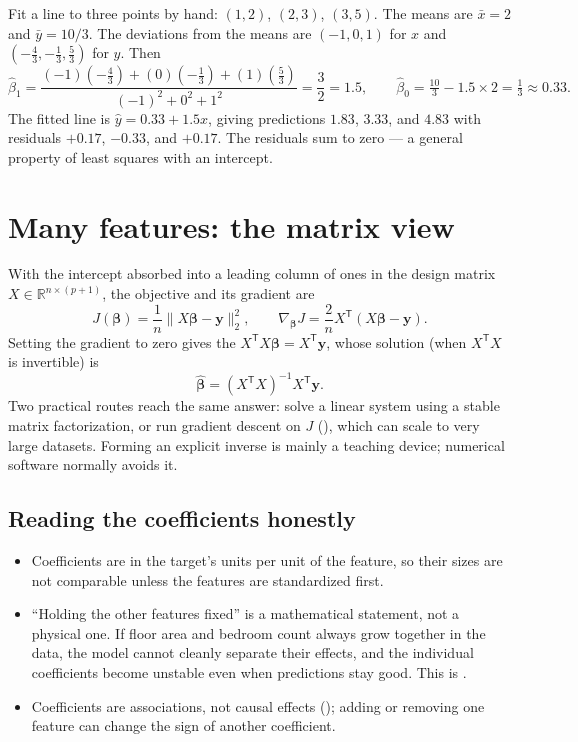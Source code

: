\begin{workedexample}
Fit a line to three points by hand: $(1,2)$, $(2,3)$, $(3,5)$.
The means are $\bar{x}=2$ and $\bar{y}=10/3$. The deviations from the means are $(-1,0,1)$ for $x$ and $(-\tfrac{4}{3},-\tfrac{1}{3},\tfrac{5}{3})$ for $y$. Then
\[
  \hat{\beta}_1
  =\frac{(-1)(-\tfrac{4}{3})+(0)(-\tfrac{1}{3})+(1)(\tfrac{5}{3})}
        {{(-1)}^2+0^2+1^2}
  =\frac{3}{2}=1.5,
  \qquad
  \hat{\beta}_0=\tfrac{10}{3}-1.5\times 2=\tfrac{1}{3}\approx 0.33.
\]
The fitted line is $\hat{y}=0.33+1.5x$, giving predictions $1.83$, $3.33$, and $4.83$ with residuals $+0.17$, $-0.33$, and $+0.17$. The residuals sum to zero --- a general property of least squares with an intercept.
\end{workedexample}

\section{Many features: the matrix view}

With the intercept absorbed into a leading column of ones in the design matrix $X\in\mathbb{R}^{n\times(p+1)}$, the objective and its gradient are
\[
  J(\bm{\beta})=\frac{1}{n}\|X\bm{\beta}-\bm{y}\|_2^2,
  \qquad
  \nabla_{\bm{\beta}}J
  =\frac{2}{n}X^{\mathsf T}(X\bm{\beta}-\bm{y}).
\]
Setting the gradient to zero gives the  $X^{\mathsf T}X\bm{\beta}=X^{\mathsf T}\bm{y}$, whose solution (when $X^{\mathsf T}X$ is invertible) is
\[
  \hat{\bm{\beta}}={(X^{\mathsf T}X)}^{-1}X^{\mathsf T}\bm{y}.
\]
Two practical routes reach the same answer: solve a linear system using a stable matrix factorization, or run gradient descent on $J$ (), which can scale to very large datasets. Forming an explicit inverse is mainly a teaching device; numerical software normally avoids it.

\subsection{Reading the coefficients honestly}

\begin{itemize}
  \item Coefficients are in the target's units per unit of the feature, so their sizes are not comparable unless the features are standardized first.
  \item ``Holding the other features fixed'' is a mathematical statement, not a physical one. If floor area and bedroom count always grow together in the data, the model cannot cleanly separate their effects, and the individual coefficients become unstable even when predictions stay good. This is .
  \item Coefficients are associations, not causal effects (); adding or removing one feature can change the sign of another coefficient.
\end{itemize}

